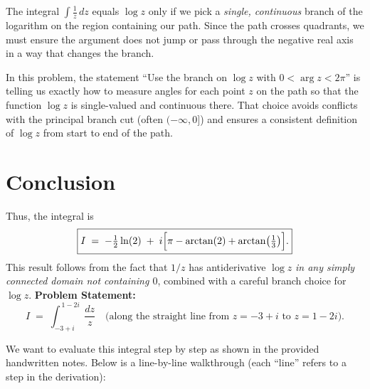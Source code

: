 \documentclass[12pt]{article}
\theoremstyle{definition} %
\theoremstyle{plain} %
\begin{document}
The integral $\int \tfrac{1}{z}\,dz$ equals $\log z$ only if we pick a \emph{single, continuous} branch of the logarithm on the region containing our path.  Since the path crosses quadrants, we must ensure the argument does not jump or pass through the negative real axis in a way that changes the branch.  

In this problem, the statement ``Use the branch on $\log z$ with $0<\arg z<2\pi$'' is telling us exactly how to measure angles for each point $z$ on the path so that the function $\log z$ is single-valued and continuous there.  That choice avoids conflicts with the principal branch cut (often $(-\infty,0]$) and ensures a consistent definition of $\log z$ from start to end of the path.

\section*{Conclusion}

Thus, the integral is
\[
\boxed{
I \;=\;
-\tfrac12 \ln(2)
\;+\;
i\Bigl[\pi - \arctan(2) + \arctan\bigl(\tfrac13\bigr)\Bigr].
}
\]
This result follows from the fact that $1/z$ has antiderivative $\log z$ \emph{in any simply connected domain not containing $0$}, combined with a careful branch choice for $\log z$.
\textbf{Problem Statement:} 
\[
I \;=\; \int_{-3 + i}^{\,1 - 2i}\,\frac{dz}{z}
\quad
\text{(along the straight line from $z=-3+i$ to $z=1-2i$).}
\]

We want to evaluate this integral step by step as shown in the provided handwritten notes. Below is a line-by-line walkthrough (each ``line'' refers to a step in the derivation):
\end{document}
